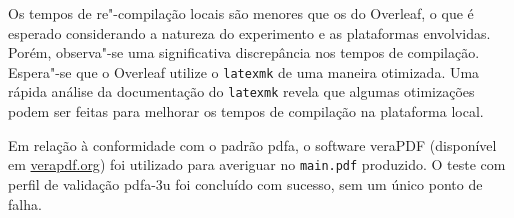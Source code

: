Os tempos de re"-compilação locais são menores que os do Overleaf, o que é esperado considerando a natureza do experimento e as plataformas envolvidas. Porém, observa"-se uma significativa discrepância nos tempos de compilação. Espera"-se que o Overleaf utilize o \texttt{latexmk} de uma maneira otimizada. Uma rápida análise da documentação do \texttt{latexmk} revela que algumas otimizações podem ser feitas para melhorar os tempos de compilação na plataforma local.

Em relação à conformidade com o padrão \ac{pdfa}, o software veraPDF (disponível em \url{verapdf.org}) foi utilizado para averiguar no \texttt{main.pdf} produzido. O teste com perfil de validação \ac{pdfa}-3u foi concluído com sucesso, sem um único ponto de falha.

